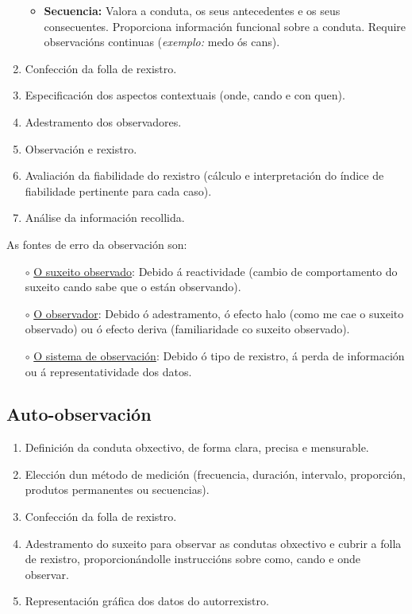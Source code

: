 \documentclass[a4paper,11pt]{article}
\begin{document}
\begin{enumerate}
\begin{itemize}
		\item \textbf{Secuencia:} Valora a conduta, os seus antecedentes e os seus consecuentes. 
		Proporciona información funcional sobre a conduta. Require observacións continuas 
		(\textit{exemplo:} medo ós cans).
	\end{itemize}
	\item Confección da folla de rexistro.
	\item Especificación dos aspectos contextuais (onde, cando e con quen). 
	\item Adestramento dos observadores.
	\item Observación e rexistro.
	\item Avaliación da fiabilidade do rexistro (cálculo e interpretación do índice de fiabilidade 
	pertinente para cada caso). 
	\item Análise da información recollida. 
\end{enumerate}

As fontes de erro da observación son:
\begin{itemize}
	\item[$\circ$] \underline{O suxeito observado}: Debido á reactividade (cambio de comportamento do 
	suxeito cando sabe que o están observando).
	\item[$\circ$] \underline{O observador}: Debido ó adestramento, ó efecto halo (como me cae o 
	suxeito observado) ou ó efecto deriva (familiaridade co suxeito observado). 
	\item[$\circ$] \underline{O sistema de observación}: Debido ó tipo de rexistro, á perda de 
	información ou á representatividade dos datos. 
\end{itemize}

\subsection{Auto-observación}
\begin{enumerate}
	\item Definición da conduta obxectivo, de forma clara, precisa e mensurable.
	\item Elección dun método de medición (frecuencia, duración, intervalo, proporción, produtos 
	permanentes ou secuencias).
	\item Confección da folla de rexistro. 
	\item Adestramento do suxeito para observar as condutas obxectivo e cubrir a folla de rexistro, 
	proporcionándolle instruccións sobre como, cando e onde observar. 
	\item Representación gráfica dos datos do autorrexistro. 
\end{enumerate}
\end{document}
